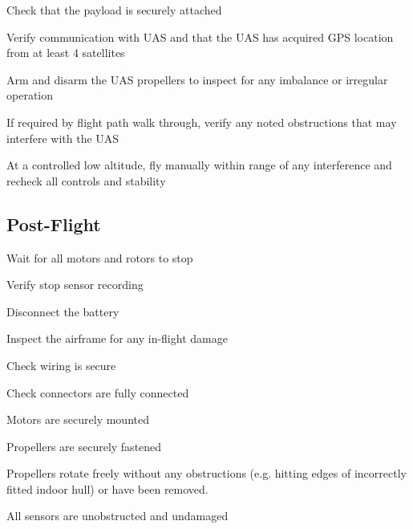 \begin{checklist}
    \item Check that the payload is securely attached
    \item Verify communication with UAS and that the UAS has acquired GPS location from at least 4 satellites
    \item Arm and disarm the UAS propellers to inspect for any imbalance or irregular operation
    \item If required by flight path walk through, verify any noted obstructions that may interfere with the UAS
    \item At a controlled low altitude, fly manually within range of any interference and recheck all controls and stability
\end{checklist}

\subsection{Post-Flight}
\label{apen1:post}

\begin{checklist}
    \item Wait for all motors and rotors to stop
    \item Verify stop sensor recording
    \item Disconnect the battery
    \item Inspect the airframe for any in-flight damage
    \item Check wiring is secure
    \item Check connectors are fully connected
    \item Motors are securely mounted
    \item Propellers are securely fastened
    \item Propellers rotate freely without any obstructions (e.g. hitting edges of incorrectly fitted indoor hull) or have been removed.
    \item All sensors are unobstructed and undamaged
\end{checklist}

